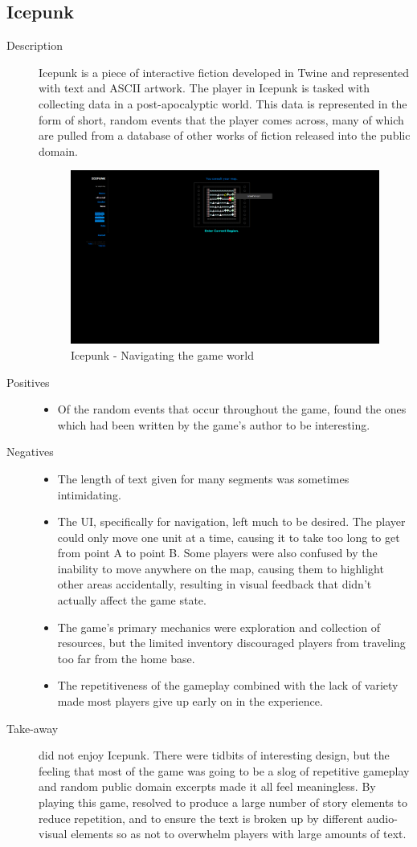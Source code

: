 \subsection{Icepunk}
\begin{description}
\item[Description]{Icepunk is a piece of interactive fiction developed in Twine and represented with text and ASCII artwork. The player in Icepunk is tasked with collecting data in a post-apocalyptic world. This data is represented in the form of short, random events that the player comes across, many of which are pulled from a database of other works of fiction released into the public domain.

\begin{figure}[htb]
	\centering\includegraphics[width=.25\linewidth]{images/game_icepunk}
	\caption{Icepunk - Navigating the game world}
	\label{fig:icepunk}
\end{figure}
}

\item[Positives]{
\begin{itemize}
\item{Of the random events that occur throughout the game, \ourteam{} found the ones which had been written by the game's author to be interesting.}
\end{itemize}}

\item[Negatives]{
\begin{itemize}
\item{The length of text given for many segments was sometimes intimidating.}
\item{The UI, specifically for navigation, left much to be desired. The player could only move one unit at a time, causing it to take too long to get from point A to point B. Some players were also confused by the inability to move anywhere on the map, causing them to highlight other areas accidentally, resulting in visual feedback that didn't actually affect the game state.}
\item{The game's primary mechanics were exploration and collection of resources, but the limited inventory discouraged players from traveling too far from the home base.}
\item{The repetitiveness of the gameplay combined with the lack of variety made most players give up early on in the experience.}
\end{itemize}}

\item[Take-away]{\ourteam{} did not enjoy Icepunk. There were tidbits of interesting design, but the feeling that most of the game was going to be a slog of repetitive gameplay and random public domain excerpts made it all feel meaningless. By playing this game, \ourteam{} resolved to produce a large number of story elements to reduce repetition, and to ensure the text is broken up by different audio-visual elements so as not to overwhelm players with large amounts of text.}
\end{description}
